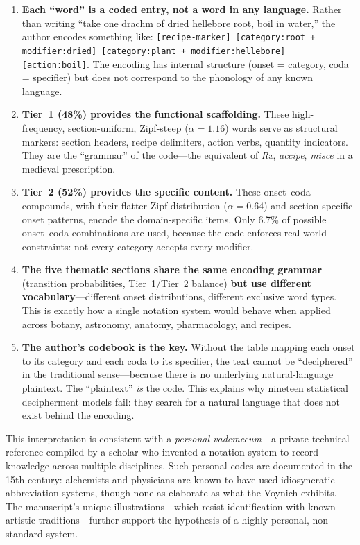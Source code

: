 \begin{enumerate}[nosep]
  \item \textbf{Each ``word'' is a coded entry, not a word in any language.}  Rather than writing ``take one drachm of dried hellebore root, boil in water,'' the author encodes something like: \texttt{[recipe-marker] [category:root + modifier:dried] [category:plant + modifier:hellebore] [action:boil]}.  The encoding has internal structure (onset = category, coda = specifier) but does not correspond to the phonology of any known language.

  \item \textbf{Tier~1 (48\%) provides the functional scaffolding.}  These high-frequency, section-uniform, Zipf-steep ($\alpha = 1.16$) words serve as structural markers: section headers, recipe delimiters, action verbs, quantity indicators.  They are the ``grammar'' of the code---the equivalent of \emph{Rx}, \emph{accipe}, \emph{misce} in a medieval prescription.

  \item \textbf{Tier~2 (52\%) provides the specific content.}  These onset--coda compounds, with their flatter Zipf distribution ($\alpha = 0.64$) and section-specific onset patterns, encode the domain-specific items.  Only 6.7\% of possible onset--coda combinations are used, because the code enforces real-world constraints: not every category accepts every modifier.

  \item \textbf{The five thematic sections share the same encoding grammar} (transition probabilities, Tier~1/Tier~2 balance) \textbf{but use different vocabulary}---different onset distributions, different exclusive word types.  This is exactly how a single notation system would behave when applied across botany, astronomy, anatomy, pharmacology, and recipes.

  \item \textbf{The author's codebook is the key.}  Without the table mapping each onset to its category and each coda to its specifier, the text cannot be ``deciphered'' in the traditional sense---because there is no underlying natural-language plaintext.  The ``plaintext'' \emph{is} the code.  This explains why nineteen statistical decipherment models fail: they search for a natural language that does not exist behind the encoding.
\end{enumerate}

This interpretation is consistent with a \emph{personal vademecum}---a private technical reference compiled by a scholar who invented a notation system to record knowledge across multiple disciplines.  Such personal codes are documented in the 15th century: alchemists and physicians are known to have used idiosyncratic abbreviation systems, though none as elaborate as what the Voynich exhibits.  The manuscript's unique illustrations---which resist identification with known artistic traditions---further support the hypothesis of a highly personal, non-standard system.

